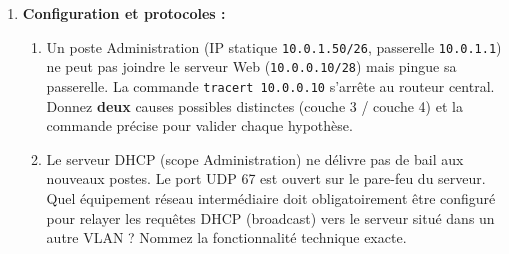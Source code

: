 \documentclass[11pt]{article}
\begin{document}
\begin{exercice}
\begin{enumerate}
    \item \textbf{Configuration et protocoles :} 
    \begin{enumerate}
        \item Un poste Administration (IP statique \texttt{10.0.1.50/26}, passerelle \texttt{10.0.1.1}) ne peut pas joindre le serveur Web (\texttt{10.0.0.10/28}) mais pingue sa passerelle. La commande \texttt{tracert 10.0.0.10} s'arrête au routeur central. Donnez \textbf{deux} causes possibles distinctes (couche 3 / couche 4) et la commande précise pour valider chaque hypothèse.
        \item Le serveur DHCP (scope Administration) ne délivre pas de bail aux nouveaux postes. Le port UDP 67 est ouvert sur le pare-feu du serveur. Quel équipement réseau intermédiaire doit obligatoirement être configuré pour relayer les requêtes DHCP (broadcast) vers le serveur situé dans un autre VLAN ? Nommez la fonctionnalité technique exacte.
    \end{enumerate}
\end{enumerate}
\end{exercice}
\end{document}
